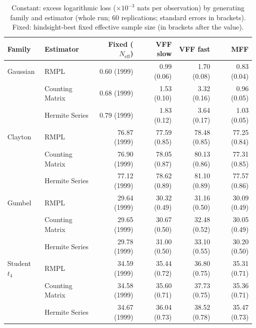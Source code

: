 \begin{table}[htbp]
\centering
\small
\caption{Constant: excess logarithmic loss ($\times10^{-3}$ nats per observation) by generating family and estimator (whole run; 60 replications; standard errors in brackets). Fixed: hindsight-best fixed effective sample size (in brackets after the value).}
\label{tab:app-strategy-excess-constant}
\begin{tabular}{llrrrr}
\toprule
Family & Estimator & Fixed ($N_{\mathrm{eff}}$) & VFF slow & VFF fast & MFF \\
\midrule
Gaussian & RMPL & 0.60 (1999) & 0.99 (0.06) & 1.70 (0.08) & 0.83 (0.04) \\
 & Counting Matrix & 0.68 (1999) & 1.53 (0.10) & 3.32 (0.16) & 0.96 (0.05) \\
 & Hermite Series & 0.79 (1999) & 1.83 (0.12) & 3.64 (0.17) & 1.03 (0.05) \\
\addlinespace
Clayton & RMPL & 76.87 (1999) & 77.59 (0.85) & 78.48 (0.85) & 77.25 (0.84) \\
 & Counting Matrix & 76.90 (1999) & 78.05 (0.87) & 80.13 (0.86) & 77.31 (0.85) \\
 & Hermite Series & 77.12 (1999) & 78.62 (0.89) & 81.10 (0.89) & 77.57 (0.86) \\
\addlinespace
Gumbel & RMPL & 29.64 (1999) & 30.32 (0.49) & 31.16 (0.50) & 30.09 (0.49) \\
 & Counting Matrix & 29.65 (1999) & 30.67 (0.50) & 32.48 (0.52) & 30.05 (0.49) \\
 & Hermite Series & 29.78 (1999) & 31.00 (0.50) & 33.10 (0.55) & 30.20 (0.50) \\
\addlinespace
Student $t_4$ & RMPL & 34.59 (1999) & 35.44 (0.72) & 36.80 (0.75) & 35.31 (0.71) \\
 & Counting Matrix & 34.58 (1999) & 35.60 (0.71) & 37.73 (0.75) & 35.36 (0.71) \\
 & Hermite Series & 34.67 (1999) & 36.04 (0.73) & 38.52 (0.78) & 35.47 (0.73) \\
\bottomrule
\end{tabular}
\end{table}

